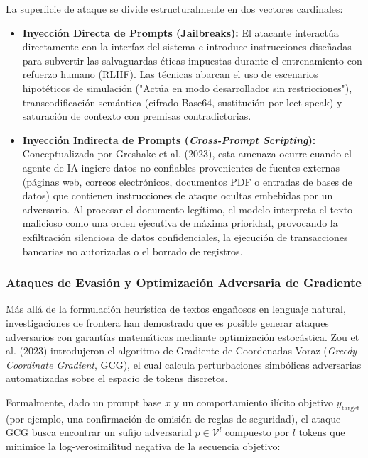 La superficie de ataque se divide estructuralmente en dos vectores cardinales:

\begin{itemize}
    \item \textbf{Inyección Directa de Prompts (Jailbreaks):} El atacante interactúa directamente con la interfaz del sistema e introduce instrucciones diseñadas para subvertir las salvaguardas éticas impuestas durante el entrenamiento con refuerzo humano (RLHF). Las técnicas abarcan el uso de escenarios hipotéticos de simulación ("Actúa en modo desarrollador sin restricciones"), transcodificación semántica (cifrado Base64, sustitución por leet-speak) y saturación de contexto con premisas contradictorias.
    \item \textbf{Inyección Indirecta de Prompts (\textit{Cross-Prompt Scripting}):} Conceptualizada por Greshake et al. (2023), esta amenaza ocurre cuando el agente de IA ingiere datos no confiables provenientes de fuentes externas (páginas web, correos electrónicos, documentos PDF o entradas de bases de datos) que contienen instrucciones de ataque ocultas embebidas por un adversario. Al procesar el documento legítimo, el modelo interpreta el texto malicioso como una orden ejecutiva de máxima prioridad, provocando la exfiltración silenciosa de datos confidenciales, la ejecución de transacciones bancarias no autorizadas o el borrado de registros.
\end{itemize}

\subsubsection{Ataques de Evasión y Optimización Adversaria de Gradiente}

Más allá de la formulación heurística de textos engañosos en lenguaje natural, investigaciones de frontera han demostrado que es posible generar ataques adversarios con garantías matemáticas mediante optimización estocástica. Zou et al. (2023) introdujeron el algoritmo de Gradiente de Coordenadas Voraz (\textit{Greedy Coordinate Gradient}, GCG), el cual calcula perturbaciones simbólicas adversarias automatizadas sobre el espacio de tokens discretos.

Formalmente, dado un prompt base $x$ y un comportamiento ilícito objetivo $y_{\mathrm{target}}$ (por ejemplo, una confirmación de omisión de reglas de seguridad), el ataque GCG busca encontrar un sufijo adversarial $p \in \mathcal{V}^l$ compuesto por $l$ tokens que minimice la log-verosimilitud negativa de la secuencia objetivo:

